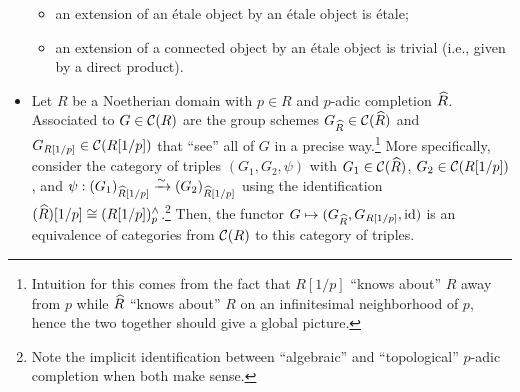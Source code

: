\documentclass[11pt]{article}
\begin{document}
\begin{itemize}
\begin{itemize}
\item an extension of an \'{e}tale object by an \'{e}tale object is \'{e}tale;

\item an extension of a connected object by an \'{e}tale object is trivial (i.e., given by a direct product).
\end{itemize}

\item Let $R$ be a Noetherian domain with $p\in R$ and $p$-adic completion $\widehat{R}$. Associated to $G\in\mathcal{C}(R)$ are the group schemes $G_{\widehat{R}}\in\mathcal{C}(\widehat{R})$ and $G_{R[1/p]}\in\mathcal{C}(R[1/p])$ that ``see'' all of $G$ in a precise way.\footnote{Intuition for this comes from the fact that $R[1/p]$ ``knows about'' $R$ away from $p$ while $\widehat{R}$ ``knows about'' $R$ on an infinitesimal neighborhood of $p$, hence the two together should give a global picture.} More specifically, consider the category of triples $(G_1,G_2,\psi)$ with $G_1\in\mathcal{C}(\widehat{R})$, $G_2\in\mathcal{C}(R[1/p])$, and $\psi: (G_1)_{\widehat{R}[1/p]}\xrightarrow{\sim}(G_2)_{\widehat{R}[1/p]}$ using the identification $(\widehat{R})[1/p]\cong(R[1/p])_p^{\wedge}$.\footnote{Note the implicit identification between ``algebraic'' and ``topological'' $p$-adic completion when both make sense.} Then, the functor $G\mapsto(G_{\widehat{R}},G_{R[1/p]},\operatorname{id})$ is an equivalence of categories from $\mathcal{C}(R)$ to this category of triples.
\end{itemize}
\end{document}
